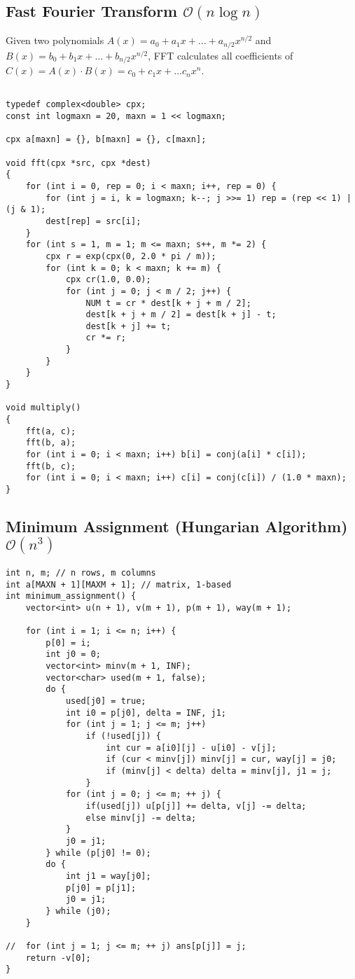 \documentclass{article}
\begin{document}
\subsection{Fast Fourier Transform $\mathcal{O}(n \log n)$}

Given two polynomials $A(x) = a_0 + a_1 x + \dots + a_{n/2} x^{n/2}$ and $B(x) = b_0 + b_1 x + \dots + b_{n/2} x^{n/2}$, FFT calculates all coefficients of $C(x) = A(x) \cdot B(x) = c_0 + c_1 x + \dots c_{n} x^{n}$.

\begin{lstlisting}

typedef complex<double> cpx;
const int logmaxn = 20, maxn = 1 << logmaxn;

cpx a[maxn] = {}, b[maxn] = {}, c[maxn];

void fft(cpx *src, cpx *dest)
{
	for (int i = 0, rep = 0; i < maxn; i++, rep = 0) {
		for (int j = i, k = logmaxn; k--; j >>= 1) rep = (rep << 1) | (j & 1);
		dest[rep] = src[i];
	}
	for (int s = 1, m = 1; m <= maxn; s++, m *= 2) {
		cpx r = exp(cpx(0, 2.0 * pi / m));
		for (int k = 0; k < maxn; k += m) {
			cpx cr(1.0, 0.0);
			for (int j = 0; j < m / 2; j++) {
				NUM t = cr * dest[k + j + m / 2];
				dest[k + j + m / 2] = dest[k + j] - t;
				dest[k + j] += t;
				cr *= r;
			}
		}
	}
}

void multiply()
{
	fft(a, c);
	fft(b, a);
	for (int i = 0; i < maxn; i++) b[i] = conj(a[i] * c[i]);
	fft(b, c);
	for (int i = 0; i < maxn; i++) c[i] = conj(c[i]) / (1.0 * maxn);
}

\end{lstlisting}

\subsection{Minimum Assignment (Hungarian Algorithm) $\mathcal{O}(n^{3})$}

\begin{lstlisting}
int n, m; // n rows, m columns
int a[MAXN + 1][MAXM + 1]; // matrix, 1-based
int minimum_assignment() {
	vector<int> u(n + 1), v(m + 1), p(m + 1), way(m + 1);

	for (int i = 1; i <= n; i++) {
		p[0] = i;
		int j0 = 0;
		vector<int> minv(m + 1, INF);
		vector<char> used(m + 1, false);
		do {
			used[j0] = true;
			int i0 = p[j0], delta = INF, j1;
			for (int j = 1; j <= m; j++)
				if (!used[j]) {
					int cur = a[i0][j] - u[i0] - v[j];
					if (cur < minv[j]) minv[j] = cur, way[j] = j0;
					if (minv[j] < delta) delta = minv[j], j1 = j;
				}
			for (int j = 0; j <= m; ++ j) {
				if(used[j]) u[p[j]] += delta, v[j] -= delta;
				else minv[j] -= delta;
			}
			j0 = j1;
		} while (p[j0] != 0);
		do {
			int j1 = way[j0];
			p[j0] = p[j1];
			j0 = j1;
		} while (j0);
	}

//	for (int j = 1; j <= m; ++ j) ans[p[j]] = j;
	return -v[0];
}
\end{lstlisting}
\end{document}
